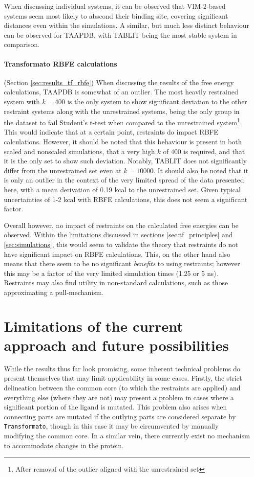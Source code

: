 \documentclass[oneside]{scrreprt}
\begin{document}
When discussing individual systems, it can be observed that VIM-2-based systems seem most likely to abscond their binding site, covering significant distances even within the simulations. A similar, but much less distinct behaviour can be observed for TAAPDB, with TABLIT being the most stable system in comparison.


\paragraph{Transformato RBFE calculations} (Section \ref{sec:results_tf_rbfe}) When discussing the results of the free energy calculations, TAAPDB is somewhat of an outlier. The most heavily restrained system with $k=400$ is the only system to show significant deviation to the other restraint systems along with the unrestrained systems, being the only group in the dataset to fail Student's t-test when compared to the unrestrained system\footnote{After removal of the outlier aligned with the unrestrained set}. This would indicate that at a certain point, restraints do impact RBFE calculations. However, it should be noted that this behaviour is present in both scaled and nonscaled simulations, that a very high $k$ of 400 is required, and that it is the only set to show such deviation. Notably, TABLIT does not significantly differ from the unrestrained set even at $k=10000$. It should also be noted that it is only an outlier in the context of the very limited spread of the data presented here, with a mean derivation of 0.19 kcal to the unrestrained set. Given typical uncertainties of 1-2 kcal with RBFE calculations, this does not seem a significant factor.

Overall however, no impact of restraints on the calculated free energies can be observed. Within the limitations discussed in sections \ref{sec:tf_principles} and \ref{sec:simulations}, this would seem to validate the theory that restraints do not have significant impact on RBFE calculations. This, on the other hand also means that there seem to be no significant \emph{benefits} to using restraints; however this may be a factor of the very limited simulation times (1.25 or 5 ns). Restraints may also find utility in non-standard calculations, such as those approximating a pull-mechanism.

\section{Limitations of the current approach and future possibilities}
While the results thus far look promising, some inherent technical problems do present themselves that may limit applicability in some cases. Firstly, the strict delineation between the common core (to which the restraints are applied) and everything else (where they are not) may present a problem in cases where a significant portion of the ligand is mutated. This problem also arises when connecting parts are mutated if the outlying parts are considered separate by \texttt{Transformato}, though in this case it may be circumvented by manually modifying the common core. In a similar vein, there currently exist no mechanism to accommodate changes in the protein.
\end{document}

